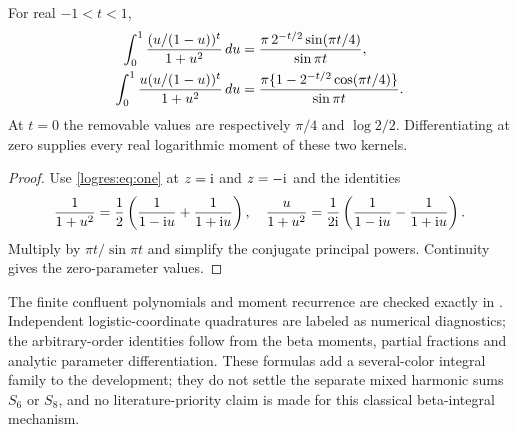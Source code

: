 \begin{corollary}
\label{logres:cor:real-generators}
For real $-1<t<1$,
\begin{align}\label{logres:eq:real-generators}
 \int_0^1\frac{(u/(1-u))^t}{1+u^2}\,du
 &=\frac{\pi\,2^{-t/2}\sin(\pi t/4)}{\sin\pi t},\notag\\
 \int_0^1\frac{u(u/(1-u))^t}{1+u^2}\,du
 &=\frac{\pi\{1-2^{-t/2}\cos(\pi t/4)\}}{\sin\pi t}.
\end{align}
At $t=0$ the removable values are respectively $\pi/4$ and
$\log2/2$. Differentiating at zero supplies every real logarithmic
moment of these two kernels.
\end{corollary}
\begin{proof}
Use \eqref{logres:eq:one} at $z=\mathrm{i}$ and $z=-\mathrm{i}$ and the identities
\[
 \frac1{1+u^2}=\frac12\left(\frac1{1-\mathrm{i} u}+\frac1{1+\mathrm{i} u}\right),
 \quad
 \frac{u}{1+u^2}=\frac1{2\mathrm{i}}\left(\frac1{1-\mathrm{i} u}-\frac1{1+\mathrm{i} u}\right).
\]
Multiply by $\pi t/\sin\pi t$ and simplify the conjugate principal
powers. Continuity gives the zero-parameter values.
\end{proof}

The finite confluent polynomials and moment recurrence are checked exactly
in . Independent
logistic-coordinate quadratures are labeled as numerical diagnostics;
the arbitrary-order identities follow from the beta moments, partial
fractions and analytic parameter differentiation. These formulas add a
several-color integral family to the development; they do not settle the
separate mixed harmonic sums $S_6$ or $S_8$, and no literature-priority
claim is made for this classical beta-integral mechanism.
